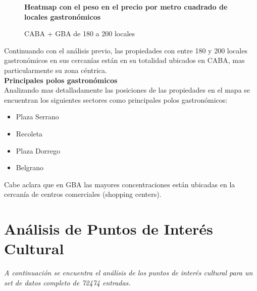 \documentclass[a4paper, 10pt]{article}
\begin{document}
				\begin{figure}
    				\centering
    				\textbf{Heatmap con el peso en el precio por metro cuadrado de locales gastronómicos}\par\medskip
    				\caption{CABA + GBA de 180 a 200 locales}
				\end{figure}								
				\FloatBarrier
				
				Continuando con el análisis previo, las propiedades con entre 180 y 200 
				locales gastronómicos en sus cercanías están en su totalidad ubicados en CABA, 
				mas particularmente su zona céntrica.\\
				
				\textbf{Principales polos gastronómicos}\\
				Analizando mas detalladamente las posiciones de las propiedades 
				en el mapa se encuentran los siguientes sectores como principales polos gastronómicos:
\begin{itemize}
	\item Plaza Serrano
	\item Recoleta
	\item Plaza Dorrego
	\item Belgrano
\end{itemize}


				Cabe aclara que en GBA las mayores concentraciones están ubicadas en la 
				cercanía de centros comerciales (shopping centers).
	
		\section{Análisis de Puntos de Interés Cultural}
			\emph{A continuación se encuentra el análisis de los puntos de interés cultural 
			para un set de datos completo de 72474 entradas.}
			
\end{document}

